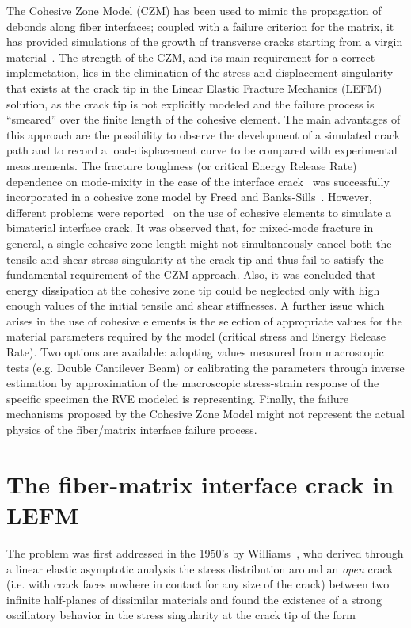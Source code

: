 The Cohesive Zone Model (CZM) has been used to mimic the propagation of debonds along fiber interfaces; coupled with a failure criterion for the matrix, it has provided simulations of the growth of transverse cracks starting from a virgin material~\cite{Kushch2011,Canal2012,Bouhala2013,Herraez2015}. The strength of the CZM, and its main requirement for a correct implemetation, lies in the elimination of the stress and displacement singularity that exists at the crack tip in the Linear Elastic Fracture Mechanics (LEFM) solution, as the crack tip is not explicitly modeled and the failure process is ``smeared'' over the finite length of the cohesive element. The main advantages of this approach are the possibility to observe the development of a simulated crack path and to record a load-displacement curve to be compared with experimental measurements. The fracture toughness (or critical Energy Release Rate) dependence on mode-mixity in the case of the interface crack~\cite{Mantic2009} was successfully incorporated in a cohesive zone model by Freed and Banks-Sills~\cite{Freed2008}. However, different problems were reported~\cite{Jin2005} on the use of cohesive elements to simulate a bimaterial interface crack. It was observed that, for mixed-mode fracture in general, a single cohesive zone length might not simultaneously cancel both the tensile and shear stress singularity at the crack tip and thus fail to satisfy the fundamental requirement of the CZM approach. Also, it was concluded that energy dissipation at the cohesive zone tip could be neglected only with high enough values of the initial tensile and shear stiffnesses. A further issue which arises in the use of cohesive elements is the selection of appropriate values for the material parameters required by the model (critical stress and Energy Release Rate). Two options are available: adopting values measured from macroscopic tests (e.g. Double Cantilever Beam) or calibrating the parameters through inverse estimation by approximation of the macroscopic stress-strain response of the specific specimen the RVE modeled is representing. Finally, the failure mechanisms proposed by the Cohesive Zone Model might not represent the actual physics of the fiber/matrix interface failure process.

\section{The fiber-matrix interface crack in LEFM}

The problem was first addressed in the 1950's by Williams~\cite{Williams1959}, who derived through a linear elastic asymptotic analysis the stress distribution around an \emph{open} crack (i.e. with crack faces nowhere in contact for any size of the crack) between two infinite half-planes of dissimilar materials and found the existence of a strong oscillatory behavior in the stress singularity at the crack tip of the form

